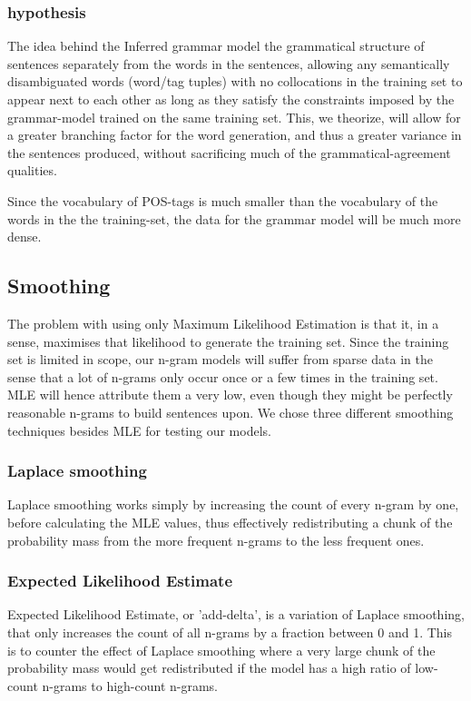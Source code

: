 \documentclass[a4paper,12pt]{article}
\begin{document}
\subsubsection{hypothesis}
The idea behind the Inferred grammar model the grammatical structure of sentences separately from the words in the sentences, allowing any semantically disambiguated words (word/tag tuples) with no collocations in the training set to appear next to each other as long as they satisfy the constraints imposed by the grammar-model trained on the same training set. This, we theorize, will allow for a greater branching factor for the word generation, and thus a greater variance in the sentences produced, without sacrificing much of the grammatical-agreement qualities.

Since the vocabulary of POS-tags is much smaller than the vocabulary of the words in the the training-set, the data for the grammar model will be much more dense. 

\subsection{Smoothing}
\label{subsec:smoothing}

The problem with using only Maximum Likelihood Estimation is that it, in a sense, maximises that likelihood to generate the training set. Since the training set is limited in scope, our n-gram models will suffer from sparse data in the sense that a lot of n-grams only occur once or a few times in the training set. MLE will hence attribute them a very low, even though they might be perfectly reasonable n-grams to build sentences upon. We chose three different smoothing techniques besides MLE for testing our models.

\subsubsection{Laplace smoothing}
Laplace smoothing works simply by increasing the count of every n-gram by one, before calculating the MLE values, thus effectively redistributing a chunk of the probability mass from the more frequent n-grams to the less frequent ones.

\subsubsection{Expected Likelihood Estimate}
Expected Likelihood Estimate, or 'add-delta', is a variation of Laplace smoothing, that only increases the count of all n-grams by a fraction between 0 and 1. This is to counter the effect of Laplace smoothing where a very large chunk of the probability mass would get redistributed if the model has a high ratio of low-count n-grams to high-count n-grams.
\end{document}
